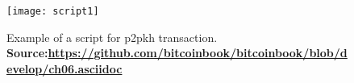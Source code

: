 \begin{figure}[!htbp]
    \centering
    \texttt{[image: script1]}
    \caption[Example of a script for \gls{p2pkh} transaction.]
    {Example of a script for \gls{p2pkh} transaction. \\ \textbf{Source:\url{https://github.com/bitcoinbook/bitcoinbook/blob/develop/ch06.asciidoc}}}
    \label{fig:script1}
\end{figure}
    